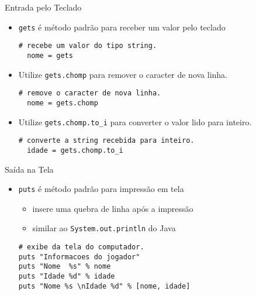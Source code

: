 \begin{frame}[fragile,t]{Entrada pelo Teclado}
    \begin{itemize}
      \item \verb!gets! é método \alert{padrão para receber} um valor pelo teclado 
          \begin{lstlisting}[style=RubyInputStyle]
  # recebe um valor do tipo string.
  nome = gets
        \end{lstlisting}
      \item Utilize \verb!gets.chomp! para remover o caracter de nova linha.
          \begin{lstlisting}[style=RubyInputStyle]
  # remove o caracter de nova linha.
  nome = gets.chomp
        \end{lstlisting}
        \item Utilize \verb!gets.chomp.to_i! para converter o valor lido para inteiro. 
          \begin{lstlisting}[style=RubyInputStyle]
  # converte a string recebida para inteiro.
  idade = gets.chomp.to_i
        \end{lstlisting}
    \end{itemize}   
  \end{frame}
\begin{frame}[fragile,t]{Saída na Tela}
    \begin{itemize}
      \item \verb!puts! é método \alert{padrão} para impressão em tela 
      \begin{itemize}
          \item insere uma quebra de linha após a impressão
          \item similar ao \verb!System.out.println! do Java
      \end{itemize}
      \begin{lstlisting}[style=RubyInputStyle]
# exibe da tela do computador.
puts "Informacoes do jogador"
puts "Nome  %s" % nome 
puts "Idade %d" % idade
puts "Nome %s \nIdade %d" % [nome, idade]
      \end{lstlisting}
    \end{itemize}   
  \end{frame}
  